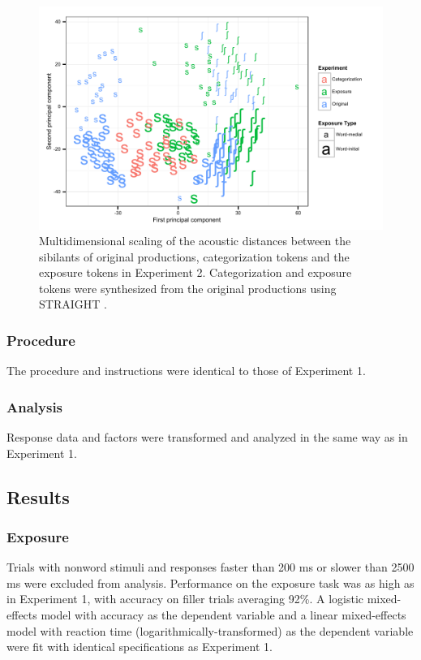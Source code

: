 \begin{figure}[ht]
\caption{Multidimensional scaling of the acoustic distances between the sibilants of original productions, categorization tokens and the exposure tokens in Experiment 2.  Categorization and exposure tokens were synthesized from the original productions using STRAIGHT \citep{Kawahara2008}.}
\label{fig:exp2mds}
\begin{center}
\includegraphics[width=\textwidth]{graphs/exp2_mds}
\end{center}
\end{figure}

\subsubsection{Procedure}

The procedure and instructions were identical to those of Experiment 1.

\subsubsection{Analysis}

Response data and factors were transformed and analyzed in the same way as in Experiment 1.

\subsection{Results}

\subsubsection{Exposure}

Trials with nonword stimuli and responses faster than 200 ms or slower than 2500 ms were excluded from analysis. 
Performance on the exposure task was as high as in Experiment 1, with accuracy on filler trials averaging 92\%.  
A logistic mixed-effects model with accuracy as the dependent variable and a linear mixed-effects model with reaction time (logarithmically-transformed) as the dependent variable were fit with identical specifications as Experiment 1.

